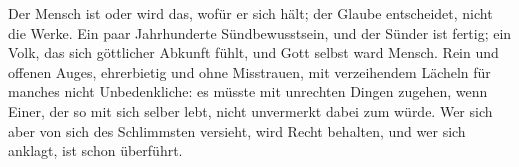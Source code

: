 Der Mensch ist oder wird das, wofür er sich hält; der Glaube entscheidet, nicht die Werke. Ein paar Jahrhunderte Sündbewusstsein, und der Sünder ist fertig; ein Volk, das sich göttlicher Abkunft fühlt, und Gott selbst ward Mensch. Rein und offenen Auges, ehrerbietig und ohne Misstrauen, mit verzeihendem Lächeln für manches nicht Unbedenkliche: es müsste mit unrechten Dingen zugehen, wenn Einer, der so mit sich selber lebt, nicht unvermerkt dabei zum  würde. Wer sich aber von sich des Schlimmsten versieht, wird Recht behalten, und wer sich anklagt, ist schon überführt.
\par

